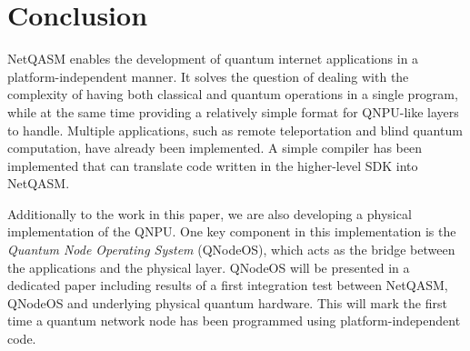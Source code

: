 \section{Conclusion}
\label{netqasm:sec:conclusion}
\ac{NetQASM} enables the development of quantum internet applications in a platform-independent manner.
It solves the question of dealing with the complexity of having both classical and quantum operations in a single program, while at the same time providing a relatively simple format for \ac{QNPU}-like layers to handle.
Multiple applications, such as remote teleportation and blind quantum computation, have already been implemented.
A simple compiler has been implemented that can translate code written in the higher-level SDK into \ac{NetQASM}.

Additionally to the work in this paper, we are also developing a physical implementation of the \ac{QNPU}.
One key component in this implementation is the \emph{Quantum Node Operating System} (QNodeOS), which acts as the bridge between the applications and the physical layer.
QNodeOS will be presented in a dedicated paper including results of a first integration test between \ac{NetQASM}, QNodeOS and underlying physical quantum hardware.
This will mark the first time a quantum network node has been programmed using platform-independent code.